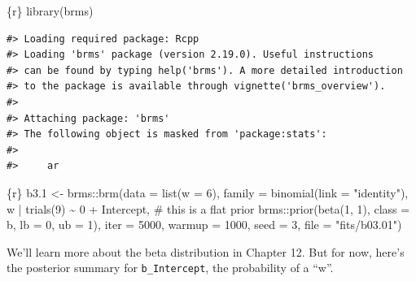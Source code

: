 \documentclass[
  letterpaper,
  DIV=11,
  numbers=noendperiod]{scrreprt}
\newenvironment{Shaded}{\begin{snugshade}}{\end{snugshade}}
\newcommand{\AttributeTok}[1]{\textcolor[rgb]{0.40,0.45,0.13}{#1}}
\newcommand{\CommentTok}[1]{\textcolor[rgb]{0.37,0.37,0.37}{#1}}
\newcommand{\DecValTok}[1]{\textcolor[rgb]{0.68,0.00,0.00}{#1}}
\newcommand{\FloatTok}[1]{\textcolor[rgb]{0.68,0.00,0.00}{#1}}
\newcommand{\FunctionTok}[1]{\textcolor[rgb]{0.28,0.35,0.67}{#1}}
\newcommand{\InformationTok}[1]{\textcolor[rgb]{0.37,0.37,0.37}{#1}}
\newcommand{\NormalTok}[1]{\textcolor[rgb]{0.00,0.23,0.31}{#1}}
\newcommand{\OtherTok}[1]{\textcolor[rgb]{0.00,0.23,0.31}{#1}}
\newcommand{\SpecialCharTok}[1]{\textcolor[rgb]{0.37,0.37,0.37}{#1}}
\newcommand{\StringTok}[1]{\textcolor[rgb]{0.13,0.47,0.30}{#1}}
\begin{document}
\begin{Shaded}
\begin{Highlighting}[]
\InformationTok{\textasciigrave{}\textasciigrave{}\textasciigrave{}\{r\}}
\FunctionTok{library}\NormalTok{(brms)}
\InformationTok{\textasciigrave{}\textasciigrave{}\textasciigrave{}}
\end{Highlighting}
\end{Shaded}

\begin{verbatim}
#> Loading required package: Rcpp
#> Loading 'brms' package (version 2.19.0). Useful instructions
#> can be found by typing help('brms'). A more detailed introduction
#> to the package is available through vignette('brms_overview').
#> 
#> Attaching package: 'brms'
#> The following object is masked from 'package:stats':
#> 
#>     ar
\end{verbatim}

\begin{Shaded}
\begin{Highlighting}[]
\InformationTok{\textasciigrave{}\textasciigrave{}\textasciigrave{}\{r\}}
\NormalTok{b3}\FloatTok{.1} \OtherTok{\textless{}{-}}
\NormalTok{  brms}\SpecialCharTok{::}\FunctionTok{brm}\NormalTok{(}\AttributeTok{data =} \FunctionTok{list}\NormalTok{(}\AttributeTok{w =} \DecValTok{6}\NormalTok{), }
      \AttributeTok{family =} \FunctionTok{binomial}\NormalTok{(}\AttributeTok{link =} \StringTok{"identity"}\NormalTok{),}
\NormalTok{      w }\SpecialCharTok{|} \FunctionTok{trials}\NormalTok{(}\DecValTok{9}\NormalTok{) }\SpecialCharTok{\textasciitilde{}} \DecValTok{0} \SpecialCharTok{+}\NormalTok{ Intercept,}
      \CommentTok{\# this is a flat prior}
\NormalTok{      brms}\SpecialCharTok{::}\FunctionTok{prior}\NormalTok{(}\FunctionTok{beta}\NormalTok{(}\DecValTok{1}\NormalTok{, }\DecValTok{1}\NormalTok{), }\AttributeTok{class =}\NormalTok{ b, }\AttributeTok{lb =} \DecValTok{0}\NormalTok{, }\AttributeTok{ub =} \DecValTok{1}\NormalTok{),}
      \AttributeTok{iter =} \DecValTok{5000}\NormalTok{, }\AttributeTok{warmup =} \DecValTok{1000}\NormalTok{,}
      \AttributeTok{seed =} \DecValTok{3}\NormalTok{,}
      \AttributeTok{file =} \StringTok{"fits/b03.01"}\NormalTok{)}
\InformationTok{\textasciigrave{}\textasciigrave{}\textasciigrave{}}
\end{Highlighting}
\end{Shaded}

We'll learn more about the beta distribution in Chapter 12. But for now,
here's the posterior summary for \texttt{b\_Intercept}, the probability
of a ``w''.
\end{document}
